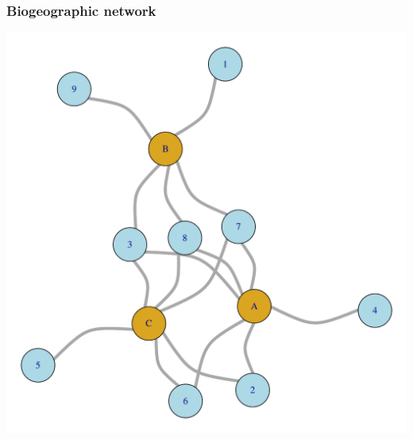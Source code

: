 \documentclass{beamer}
\begin{document}
\begin{frame}
  \frametitle{Biogeographic network}

  \begin{center}
    \includegraphics[height = 0.8\textheight, width = \textwidth, keepaspectratio = true]{figure/sim_graph}
  \end{center}

\end{frame}
\end{document}
